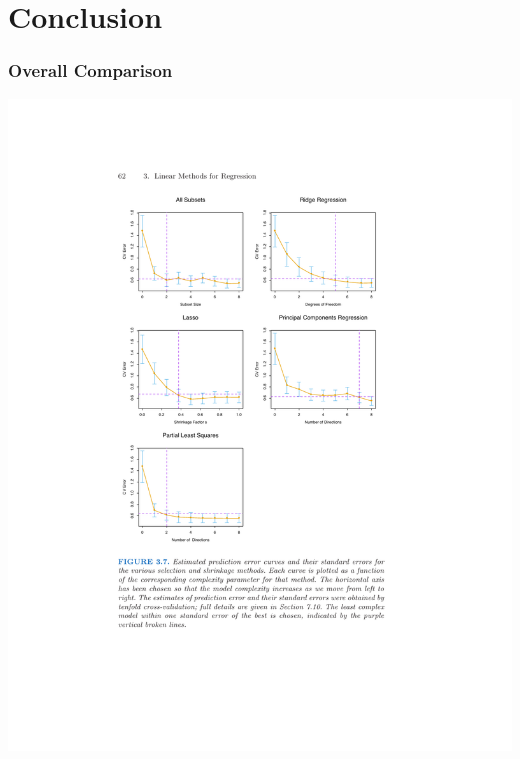 \section{Conclusion}

\begin{frame}
    \frametitle{Overall Comparison}
    \vspace{-15pt}
    \begin{center}
    \includegraphics[width=\textwidth]{./resources/comparisons}
    \end{center}
\end{frame}
    
